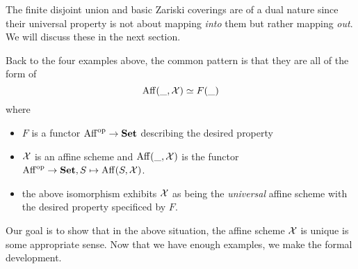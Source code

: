 \documentclass[./main.tex]{subfiles}
\begin{document}
The finite disjoint union and basic Zariski coverings
are of a dual nature since their universal property is
not about mapping \emph{into} them but rather
mapping \emph{out}.
We will discuss these in the next section.

Back to the four examples above,
the common pattern is that
they are all of the form of \[
  \mathrm{Aff}(\_ , \mathcal{X}) \simeq F(\_)  
\]
where \begin{itemize}
  \item $F$ is a functor $\mathrm{Aff}^{\mathrm{op}} \to \mathbf{Set}$
  describing the desired property
  \item $\mathcal{X}$ is an affine scheme and $\mathrm{Aff}(\_ , \mathcal{X})$
  is the functor $\mathrm{Aff}^{\mathrm{op}} \to \mathbf{Set}, S \mapsto \mathrm{Aff}(S , \mathcal{X})$.
  \item the above isomorphism exhibits $\mathcal{X}$
  as being the \emph{universal} affine scheme
  with the desired property specificed by $F$.
\end{itemize}
Our goal is to show that in the above situation,
the affine scheme $\mathcal{X}$ is unique is some appropriate sense.
Now that we have enough examples,
we make the formal development.
\end{document}
